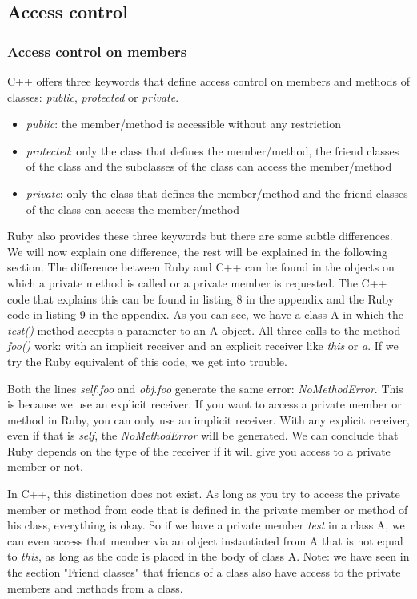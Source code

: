 \documentclass[10pt,a4paper,twocolumn]{article}
\begin{document}
\subsection{Access control}

\subsubsection{Access control on members}
C++ offers three keywords that define access control on members and methods of classes: \textit{public}, \textit{protected} or \textit{private}. 

\begin{itemize}
\item \textit{public}: the member/method is accessible without any restriction
\item \textit{protected}: only the class that defines the member/method, the friend classes of the class and the subclasses of the class can access the member/method
\item \textit{private}: only the class that defines the member/method and the friend classes of the class can access the member/method
\end{itemize}

Ruby also provides these three keywords but there are some subtle differences. We will now explain one difference, the rest will be explained in the following section. The difference between Ruby and C++ can be found in the objects on which a private method is called or a private member is requested. The C++ code that explains this can be found in listing 8 in the appendix and the Ruby code in listing 9 in the appendix. As you can see, we have a class A in which the \textit{test()}-method accepts a parameter to an A object. All three calls to the method \textit{foo()} work: with an implicit receiver and an explicit receiver like \textit{this} or \textit{a}. If we try the Ruby equivalent of this code, we get into trouble.

Both the lines \textit{self.foo} and \textit{obj.foo} generate the same error: \textit{NoMethodError}. This is because we use an explicit receiver. If you want to access a private member or method in Ruby, you can only use an implicit receiver. With any explicit receiver, even if that is \textit{self}, the \textit{NoMethodError} will be generated. We can conclude that Ruby depends on the type of the receiver if it will give you access to a private member or not.

In C++, this distinction does not exist. As long as you try to access the private member or method from code that is defined in the private member or method of his class, everything is okay. So if we have a private member \textit{test} in a class A, we can even access that member via an object instantiated from A that is not equal to \textit{this}, as long as the code is placed in the body of class A. Note: we have seen in the section "Friend classes" that friends of a class also have access to the private members and methods from a class.
\end{document}
